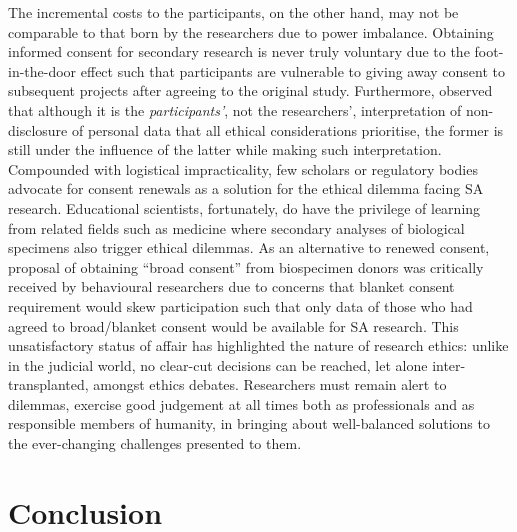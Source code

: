 \documentclass[
        a4paper, %
        12pt, %
        stu, %
        noextraspace, %
        floatsintext, %
        biblatex, %
        twoside, %
        colorlinks=true,        %
        linkcolor=red,          %
        anchorcolor=red,      %
        citecolor=blue,         %
        urlcolor=blue,          %
        bookmarks=true,         %
        bookmarksopen=false,    %
        bookmarksnumbered=true,  %
        dvipsnames
]{apa7}
\begin{document}
The incremental costs to the participants, on the other hand, may not be comparable to that born by the researchers due to power imbalance. Obtaining informed consent for secondary research is never truly voluntary due to the foot-in-the-door effect \parencite{freedman:1966} such that participants are vulnerable to giving away consent to subsequent projects after agreeing to the original study. Furthermore, \textcite{law:2005} observed that although it is the \emph{participants'}, not the researchers', interpretation of non-disclosure of personal data that all ethical considerations prioritise, the former is still under the influence of the latter while making such interpretation. Compounded with logistical impracticality, few scholars or regulatory bodies advocate for consent renewals as a solution for the ethical dilemma facing SA research. Educational scientists, fortunately, do have the privilege of learning from related fields such as medicine where secondary analyses of biological specimens also trigger ethical dilemmas. As an alternative to renewed consent,  proposal of obtaining ``broad consent'' from biospecimen donors was critically received by behavioural researchers due to concerns that blanket consent requirement would skew participation such that only data of those who had agreed to broad/blanket consent would be available for SA research. This unsatisfactory status of affair has highlighted the nature of research ethics: unlike in the judicial world, no clear-cut decisions can be reached, let alone inter-transplanted, amongst ethics debates. Researchers must remain alert to dilemmas, exercise good judgement at all times both as professionals and as responsible members of humanity, in bringing about well-balanced solutions to the ever-changing challenges presented to them.

\section{Conclusion}
\end{document}

